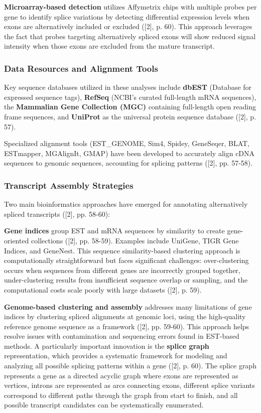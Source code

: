 \documentclass[12pt,a4paper]{article}
\begin{document}
\textbf{Microarray-based detection} utilizes Affymetrix chips with multiple probes per gene to identify splice variations by detecting differential expression levels when exons are alternatively included or excluded ([2], p. 60). This approach leverages the fact that probes targeting alternatively spliced exons will show reduced signal intensity when those exons are excluded from the mature transcript.

\subsubsection{Data Resources and Alignment Tools}

Key sequence databases utilized in these analyses include \textbf{dbEST} (Database for expressed sequence tags), \textbf{RefSeq} (NCBI's curated full-length mRNA sequences), the \textbf{Mammalian Gene Collection (MGC)} containing full-length open reading frame sequences, and \textbf{UniProt} as the universal protein sequence database ([2], p. 57).

Specialized alignment tools (EST\_GENOME, Sim4, Spidey, GeneSeqer, BLAT, ESTmapper, MGAlignIt, GMAP) have been developed to accurately align cDNA sequences to genomic sequences, accounting for splicing patterns ([2], pp. 57-58).

\subsubsection{Transcript Assembly Strategies}

Two main bioinformatics approaches have emerged for annotating alternatively spliced transcripts ([2], pp. 58-60):

\textbf{Gene indices} group EST and mRNA sequences by similarity to create gene-oriented collections ([2], pp. 58-59). Examples include UniGene, TIGR Gene Indices, and GeneNest. This sequence similarity-based clustering approach is computationally straightforward but faces significant challenges: over-clustering occurs when sequences from different genes are incorrectly grouped together, under-clustering results from insufficient sequence overlap or sampling, and the computational costs scale poorly with large datasets ([2], p. 59).

\textbf{Genome-based clustering and assembly} addresses many limitations of gene indices by clustering spliced alignments at genomic loci, using the high-quality reference genome sequence as a framework ([2], pp. 59-60). This approach helps resolve issues with contamination and sequencing errors found in EST-based methods. A particularly important innovation is the \textbf{splice graph} representation, which provides a systematic framework for modeling and analyzing all possible splicing patterns within a gene ([2], p. 60). The splice graph represents a gene as a directed acyclic graph where exons are represented as vertices, introns are represented as arcs connecting exons, different splice variants correspond to different paths through the graph from start to finish, and all possible transcript candidates can be systematically enumerated.
\end{document}
